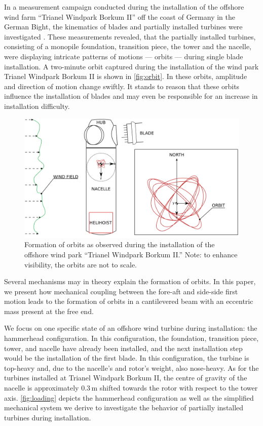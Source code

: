\documentclass{article}
\begin{document}
\clearpage

In a measurement campaign conducted during the installation of the offshore wind farm ``Trianel Windpark Borkum II'' off the coast of Germany in the German Bight, the kinematics of blades and partially installed turbines were investigated \citep{sanderRelativeMotionSingle2020,  sanderMONITORINGOFFSHOREWIND2020, sanderOscillationsOffshoreWind2020}. These measurements revealed, that the partially installed turbines, consisting of a monopile foundation, transition piece, the tower and the nacelle, were displaying intricate patterns of motions — orbits — during single blade installation. A two-minute orbit captured during the installation of the wind park Trianel Windpark Borkum II is shown in \autoref{fig:orbit}. In these orbits, amplitude and direction of motion change swiftly. It stands to reason that these orbits influence the installation of blades and may even be responsible for an increase in installation difficulty.

\begin{figure}
    \centering
    \includegraphics[width=0.7\linewidth]{figures/installation_alt2.png}
    \caption{Formation of orbits as observed during the installation of the offshore wind park ``Trianel Windpark Borkum II.'' Note: to enhance visibility, the orbits are not to scale.}
    \label{fig:orbit}
\end{figure}

Several mechanisms may in theory explain the formation of orbits. In this paper, we present how mechanical coupling between the fore-aft and side-side first motion leads to the formation of orbits in a cantilevered beam with an eccentric mass present at the free end. 

We focus on one specific state of an offshore wind turbine during installation: the hammerhead configuration. In this configuration, the foundation, transition piece, tower, and nacelle have already been installed, and the next installation step would be the installation of the first blade. In this configuration, the turbine is top-heavy and, due to the nacelle's and rotor's weight, also nose-heavy. As for the turbines installed at Trianel Windpark Borkum II, the centre of gravity of the nacelle is approximately 0.3\,m shifted towards the rotor with respect to the tower axis. \autoref{fig:loading} depicts the hammerhead configuration as well as the simplified mechanical system we derive to investigate the behavior of partially installed turbines during installation. 
\end{document}
